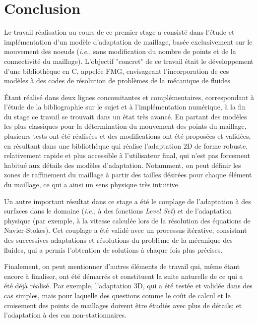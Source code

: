 \section{Conclusion}

\indent Le travail réalisation au cours de ce premier stage a consisté dans l'étude et implémentation d'un modèle d'adaptation de maillage, basée exclusivement sur le mouvement des noeuds (\emph{i.e.}, sans modification du nombre de points et de la connectivité du maillage). L'objectif "concret" de ce travail était le développement d'une bibliothèque en C, appelée FMG, envisageant l'incorporation de ces modèles à des codes de résolution de problèmes de la mécanique de fluides.

\indent Étant réalisé dans deux lignes concomitantes et complémentaires, correspondant à l'étude de la bibliographie sur le sujet et à l'implémentation numérique, à la fin du stage ce travail se trouvait dans un état très avancé. En partant des modèles les plus classiques pour la détermination du mouvement des points du maillage, plusieurs tests ont été réalisées et des modifications ont été proposées et validées, en résultant dans une bibliothèque qui réalise l'adaptation 2D de forme robuste, relativement rapide et plus accessible à l'utilisateur final, qui n'est pas forcement habitué aux détails des modèles d'adaptation. Notamment, on peut définir les zones de raffinement du maillage à partir des tailles désirées pour chaque élément du maillage, ce qui a ainsi un sens physique très intuitive.

\indent Un autre important résultat dans ce stage a été le couplage de l'adaptation à des surfaces dans le domaine (\emph{i.e.}, à des fonctions \emph{Level Set}) et de l'adaptation physique (par exemple, à la vitesse calculée lors de la résolution des équations de Navier-Stokes). Cet couplage a été validé avec un processus itérative, consistant des successives adaptations et résolutions du problème de la mécanique des fluides, qui a permis l'obtention de solutions à chaque fois plus précises.

\indent Finalement, on peut mentionner d'autres éléments de travail qui, même étant encore à finaliser, ont été démarrés et constituent la suite naturelle de ce qui a été déjà réalisé. Par exemple, l'adaptation 3D, qui a été testée et validée dans des cas simples, mais pour laquelle des questions comme le coût de calcul et le croisement des points de maillages doivent être étudiés avec plus de détails; et l'adaptation à des cas non-stationnaires.

  